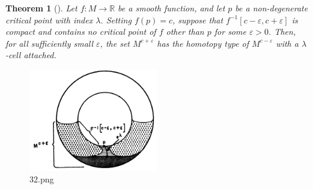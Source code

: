 \documentclass[reqno]{amsart}
\newtheorem{theorem}{Theorem}[section]
\theoremstyle{definition}
\theoremstyle{remark}
\begin{document}
    \begin{theorem}[]\label{Thm:3890009}
        Let $f \colon M \to \mathbb{R}$ be a smooth
        function, and let $p$ be a non-degenerate critical
        point with index $\lambda$. Setting
        $f(p) = c$, suppose that
        $f^{-1}\left[ c-\varepsilon, c +\varepsilon \right] $ is
        compact and contains no critical point of $f$ other
        than $p$ for some $\varepsilon > 0$. Then, for
        all sufficiently small $\varepsilon$, the
        set $M^{c+ \varepsilon}$ has the homotopy type
        of $M^{c-\varepsilon}$ with a $\lambda$-cell attached.
    \end{theorem}

    \begin{figure}[htpb]
        \centering
        \includegraphics[width=0.5\textwidth]{32.png}
        \caption{32.png}
        \label{fig:32-png}
    \end{figure}
\end{document}
